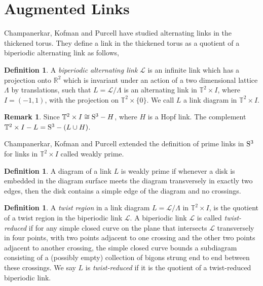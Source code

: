 \documentclass[11pt]{amsart}
\newcommand{\Sp}{{\rm{S}}}
\newcommand{\R}{\mathbb{R}}
\newcommand{\torus}{{\mathbb{T}^2}}
\theoremstyle{plain}
\theoremstyle{definition}
\newtheorem{define}[theorem]{Definition}
\newtheorem{remark}[theorem]{Remark}
\begin{document}
 
\section{Augmented Links}
 Champanerkar, Kofman and Purcell have studied alternating links in the thickened torus. They define a link in the thickened torus as a quotient of a biperiodic alternating link as follows,
 
\begin{define}\cite{CKP2}
\label{def:biperiodiclink}
A \emph{biperiodic alternating link} $\mathcal{L}$ is an infinite link
which has a projection onto
$\R^2$ which is invariant under an action of a two dimensional lattice $\Lambda$
by translations, such that $L=\mathcal{L}/\Lambda$ is an alternating link in
$\torus \times I$, where $I = (-1,1)$, with the projection on $\torus \times \{0\}$.
We call $L$ a link diagram in $\torus \times I$.   
\end{define}

\begin{remark}
Since $\torus \times I \cong \Sp^3 - H$, where $H$ is a Hopf link. The complement $\torus \times I- L = \Sp^3 - (L \cup H)$.
\end{remark}

Champanerkar, Kofman and Purcell \cite{CKP2} extended the definition of prime links in $\Sp^3$ for links in $\torus \times I$ called weakly prime. 

 \begin{define} \label{def:weaklyprime}
A diagram of a link $L$ is weakly prime if whenever a disk is embedded in the diagram surface meets the diagram transversely in exactly two edges, then the disk contains a simple edge of the diagram and no crossings.
\end{define}


\begin{define}
A \emph{twist region} in a link diagram $L=\mathcal{L}/\Lambda$ in $\torus \times I$, is the quotient of a twist region in the biperiodic link $\mathcal{L}$. %
A biperiodic link $\mathcal{L}$ is called \emph{twist-reduced} if for any simple closed curve on the plane that intersects $\mathcal{L}$ transversely in four points, with two points adjacent to one crossing and the other two points adjacent to another crossing, the simple closed
curve bounds a subdiagram consisting of a (possibly empty) collection of bigons
strung end to end between these crossings. We say $L$ is \emph{twist-reduced} if it is the quotient of a twist-reduced biperiodic link. 
\end{define}
\end{document}

